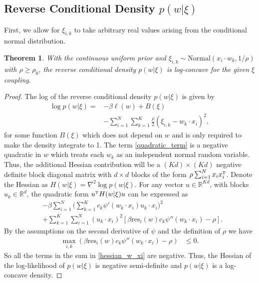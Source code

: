 \documentclass{article}
\numberwithin{equation}{section}
\theoremstyle{Lemma}
\theoremstyle{Corollary}
\theoremstyle{Theorem}
\newtheorem{theorem}{Theorem}
\theoremstyle{Remark}
\begin{document}
\subsection{Reverse Conditional Density $p(w|\xi)$}
First, we allow for $\xi_{i,k}$ to take arbitrary real values arising from the conditional normal distribution.
\begin{theorem}\label{rev_coup_thm_1}
   With the continuous uniform prior and $\xi_{i,k} \sim \text{Normal}(x_{i}\cdot w_{k}, 1/\rho)$ with $\rho\ge \rho_0$, the reverse conditional density $p(w|\xi)$ is log-concave for the given $\xi$ coupling.
\end{theorem}
\begin{proof}
    The log of the reverse conditional density $p(w|\xi)$ is given by
    \begin{align}
        \log p(w|\xi)=& - \beta \ell(w)+B(\xi)\\
        &-\sum_{i=1}^{N}\sum_{k=1}^{K}\frac{\rho}{2}(\xi_{i,k}-w_{k}\cdot x_{i})^{2},\label{quadratic_term}
    \end{align}
    for some function $B(\xi)$ which does not depend on $w$ and is only required to make the density integrate to 1. The term \eqref{quadratic_term} is a negative quadratic in $w$ which treats each $w_{k}$ as an independent normal random variable. Thus, the additional Hessian contribution will be a $(Kd) \times (Kd)$ negative definite block diagonal matrix with $d \times d$ blocks of the form $\rho\sum_{i=1}^{N}x_{i}x_{i}^{\text{\tiny{T}}}$. Denote the Hessian as $H(w|\xi) = \nabla^{2} \log p(w|\xi)$. For any vector $u \in \mathbb{R}^{Kd}$, with blocks $u_{k} \in \mathbb{R}^{d}$, the quadratic form $u^{\text{\tiny{T}}}H(w|\xi)u$ can be expressed as
    \begin{align}
    &-\beta\sum_{i=1}^{N}\Big(\sum_{k=1}^{K} c_{k}\psi'(w_{k}\cdot x_{i})u_{k}\cdot x_{i}\Big)^{2}\\
    &+\sum_{k=1}^{K}\sum_{i=1}^{N}(u_{k}\cdot x_{i})^{2}[ \beta \text{res}_{i}(w)c_{k}\psi''(w_{k}\cdot x_{i})-\rho].\label{hessian_w_xi}
    \end{align}
    By the assumptions on the second derivative of $\psi$ and the definition of $\rho$ we have
    \begin{align}
        \max_{i,k}(\beta \text{res}_{i}(w)c_{k}\psi''(w_{k}\cdot x_{i})-\rho)&\leq 0.
    \end{align}
    So all the terms in the sum in \eqref{hessian_w_xi} are negative. Thus, the Hessian of the log-likelihood of $p(w|\xi)$ is negative semi-definite and $p(w|\xi)$ is a log-concave density.
\end{proof}
\end{document}
